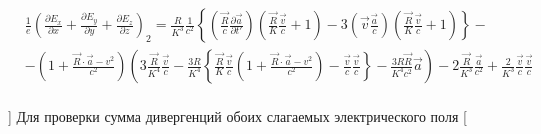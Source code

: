 \documentclass[11pt]{article}
\begin{document}
\begin{align}
  & \frac{1}{e}{{\left( \frac{\partial {{E}_{x}}}{\partial x}+\frac{\partial {{E}_{y}}}{\partial y}+\frac{\partial {{E}_{z}}}{\partial z} \right)}_{2}}=\frac{R}{{{K}^{3}}}\frac{1}{{{c}^{2}}}\left\{ \left( \frac{\overrightarrow{R}}{c}\frac{\partial \overrightarrow{a}}{\partial t'} \right)\left( \frac{\overrightarrow{R}}{K}\frac{\overrightarrow{v}}{c}+1 \right)-3\left( \overrightarrow{v}\frac{\overrightarrow{a}}{c} \right)\left( \frac{\overrightarrow{R}}{K}\frac{\overrightarrow{v}}{c}+1 \right) \right\}- \\ 
 & -\left( 1+\frac{\overrightarrow{R}\cdot \overrightarrow{a}-{{v}^{2}}}{{{c}^{2}}} \right)\left( 3\frac{\overrightarrow{R}}{{{K}^{4}}}\frac{\overrightarrow{v}}{c}-\frac{3R}{{{K}^{4}}}\left\{ \frac{\overrightarrow{R}}{K}\frac{\overrightarrow{v}}{c}\left( 1+\frac{\overrightarrow{R}\cdot \overrightarrow{a}-{{v}^{2}}}{{{c}^{2}}} \right)-\frac{\overrightarrow{v}}{c}\frac{\overrightarrow{v}}{c} \right\}-\frac{3R\overrightarrow{R}}{{{K}^{4}}{{c}^{2}}}\overrightarrow{a} \right)-2\frac{\overrightarrow{R}}{{{K}^{3}}}\frac{\overrightarrow{a}}{{{c}^{2}}}+\frac{2}{{{K}^{3}}}\frac{\overrightarrow{v}}{c}\frac{\overrightarrow{v}}{c} \\ 
\end{align}

{]} Для проверки сумма дивергенций обоих слагаемых электрического поля
{[}
\end{document}
